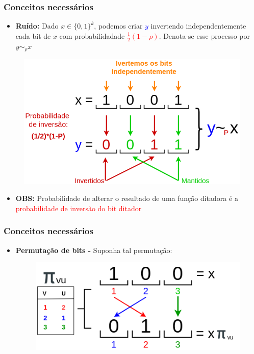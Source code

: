 \documentclass[11pt, handout]{beamer}
\newcommand{\red}[1]{\textcolor{red}{#1}}
\newcommand{\blue}[1]{\textcolor{blue}{#1}}
\begin{document}
\begin{frame}[<+->]
\frametitle{Conceitos necessários}
    \begin{itemize}
        \item \textbf{Ruído:} Dado $x\in \{0,1\}^k$, podemos criar \blue{$y$} invertendo independentemente cada bit de $x$ com probabilidadade \red{$\frac{1}{2} (1-\rho)$}. Denota-se esse processo por $y\sim_\rho x$
    \end{itemize}
    \begin{figure}
            \includegraphics[height=0.4\textwidth]{images/noise.png}
    \end{figure}
    \begin{itemize}
        \item \textbf{OBS:} Probabilidade de alterar o resultado de uma função ditadora é a \red{probabilidade de inversão do bit ditador}
    \end{itemize}
\end{frame}{}

\begin{frame}[<+->]
\frametitle{Conceitos necessários}
    \begin{itemize}
    \item \textbf{Permutação de bits -} Suponha tal permutação:
    \begin{figure}
        \includegraphics[height=0.3\textwidth]{images/bit_perm.png}
    \end{figure}{}
    \end{itemize}
\end{frame}{}
\end{document}
